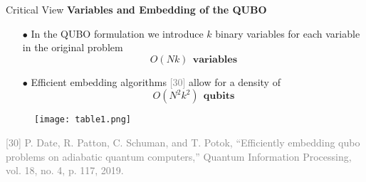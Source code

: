 \begin{frame}[allowframebreaks]{Critical View}
		\framebreak
		\textbf{Variables and Embedding of the QUBO}
		\begin{itemize}
			\item[$\bullet$] In the QUBO formulation we introduce $k$ binary variables for each variable in the original problem \\ $$O(Nk) \:\: \textbf{variables}$$ %
			\item[$\bullet$] Efficient embedding algorithms \textcolor{gray}{[30]} allow for a density of \\ $$O(N^2 k^2) \:\: \textbf{qubits}$$ 
		\end{itemize}
		\vspace{-0.5cm}
		\begin{figure}
			\centering
			\texttt{[image: table1.png]}
		\end{figure}
		\vspace{-0.3cm}
		\tiny{\textcolor{gray}{[30] P. Date, R. Patton, C. Schuman, and T. Potok, “Efficiently embedding qubo problems on adiabatic quantum computers,” Quantum Information Processing, vol. 18, no. 4, p. 117, 2019.}}

		

\end{frame}
